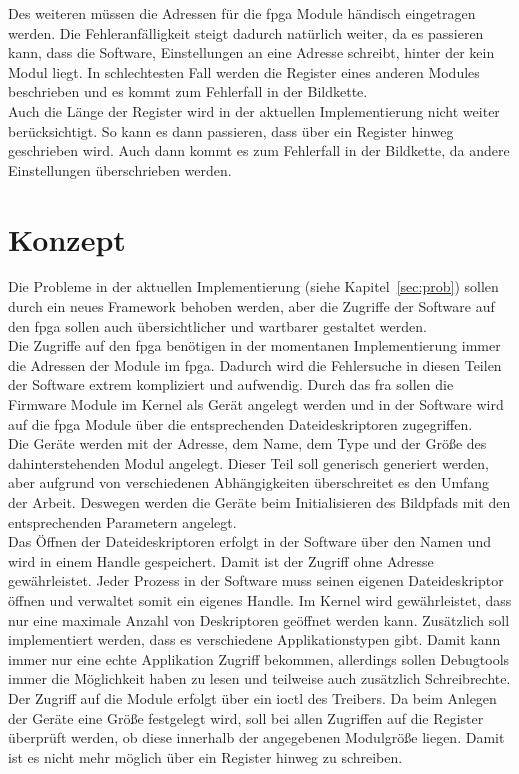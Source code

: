 Des weiteren müssen die Adressen für die \ac{fpga} Module händisch eingetragen werden. Die Fehleranfälligkeit steigt dadurch natürlich weiter, da es passieren kann, dass die Software, Einstellungen an eine Adresse schreibt, hinter der kein Modul liegt. In schlechtesten Fall werden die Register eines anderen Modules beschrieben und es kommt zum Fehlerfall in der Bildkette.\\


Auch die Länge der Register wird in der aktuellen Implementierung nicht weiter berücksichtigt. So kann es dann passieren, dass über ein Register hinweg geschrieben wird. Auch dann kommt es zum Fehlerfall in der Bildkette, da andere Einstellungen überschrieben werden. 
 
\section{Konzept}\label{sec:konzept}
Die Probleme in der aktuellen Implementierung (siehe Kapitel~\ref{sec:prob}) sollen durch ein neues Framework behoben werden, aber die Zugriffe der Software auf den \ac{fpga} sollen auch übersichtlicher und wartbarer gestaltet werden. \\

Die Zugriffe auf den \ac{fpga} benötigen in der momentanen Implementierung immer die Adressen der Module im \ac{fpga}. Dadurch wird die Fehlersuche in diesen Teilen der Software extrem kompliziert und aufwendig. Durch das \ac{fra} sollen die Firmware Module im Kernel als Gerät angelegt werden und in der Software wird auf die \ac{fpga} Module über die entsprechenden Dateideskriptoren zugegriffen. \\


Die Geräte werden mit der Adresse, dem Name, dem Type und der Größe des dahinterstehenden Modul angelegt. Dieser Teil soll generisch generiert werden, aber aufgrund von verschiedenen Abhängigkeiten überschreitet es den Umfang der Arbeit. Deswegen werden die Geräte beim Initialisieren des Bildpfads mit den entsprechenden Parametern angelegt. \\

Das Öffnen der Dateideskriptoren erfolgt in der Software über den Namen und wird in einem Handle gespeichert. Damit ist der Zugriff ohne Adresse gewährleistet. Jeder Prozess in der Software muss seinen eigenen Dateideskriptor öffnen und verwaltet somit ein eigenes Handle. 
Im Kernel wird gewährleistet, dass nur eine maximale Anzahl von Deskriptoren geöffnet werden kann. Zusätzlich soll implementiert werden, dass es verschiedene Applikationstypen gibt. Damit kann immer nur eine echte Applikation Zugriff bekommen, allerdings sollen Debugtools immer die Möglichkeit haben zu lesen und teilweise auch zusätzlich Schreibrechte. \\

Der Zugriff auf die Module erfolgt über ein \ac{ioctl} des Treibers. Da beim Anlegen der Geräte eine Größe festgelegt wird, soll bei allen Zugriffen auf die Register überprüft werden, ob diese innerhalb der angegebenen Modulgröße liegen. Damit ist es nicht mehr möglich über ein Register hinweg zu schreiben.\\



